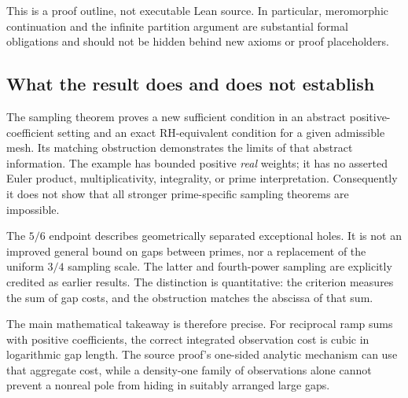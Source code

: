 \documentclass[11pt,a4paper]{article}
\theoremstyle{definition}
\theoremstyle{remark}
\numberwithin{equation}{section}
\begin{document}
This is a proof outline, not executable Lean source. In particular,
meromorphic continuation and the infinite partition argument are
substantial formal obligations and should not be hidden behind new
axioms or proof placeholders.

\subsection{What the result does and does not establish}

The sampling theorem proves a new sufficient condition in an abstract
positive-coefficient setting and an exact RH-equivalent condition for
a given admissible mesh. Its matching obstruction demonstrates the
limits of that abstract information. The example has bounded positive
\emph{real} weights; it has no asserted Euler product,
multiplicativity, integrality, or prime interpretation. Consequently
it does not show that all stronger prime-specific sampling theorems
are impossible.

The \(5/6\) endpoint describes geometrically separated exceptional
holes. It is not an improved general bound on gaps between primes,
nor a replacement of the uniform \(3/4\) sampling scale. The latter
and fourth-power sampling are explicitly credited as earlier results.
The distinction is quantitative: the criterion measures the sum of
gap costs, and the obstruction matches the abscissa of that sum.

The main mathematical takeaway is therefore precise. For reciprocal
ramp sums with positive coefficients, the correct integrated
observation cost is cubic in logarithmic gap length. The source
proof's one-sided analytic mechanism can use that aggregate cost,
while a density-one family of observations alone cannot prevent a
nonreal pole from hiding in suitably arranged large gaps.
\end{document}
